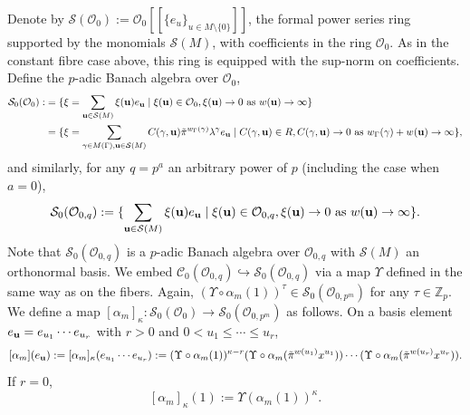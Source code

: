 \documentclass{article}
\theoremstyle{remark}
\def\bb #1{ {\mathbb #1} }
\def\c #1{ {\mathcal #1} }
\def\b #1{ {\bf #1} }
\begin{document}
\bigskip{}  Denote by $\c S(\c O_0) := \c O_0[[ \{ e_u \}_{u \in M \setminus \{0\}}]]$, the formal power series ring supported by the monomials $\c S(M)$, with coefficients in the ring $\c O_0$.  As in the constant fibre case above, this ring is equipped with the sup-norm on coefficients.  Define the $p$-adic Banach algebra over $\c O_0$,
\begin{align*}
\c S_0(\c O_0) :&= \{ \xi =  \sum_{\b u \in \c S(M)} \xi(\b u) e_{\b u} \mid \xi(\b u) \in \c O_0, \xi(\b u) \rightarrow 0 \text{ as } w(\b u) \rightarrow \infty \} \\
&= \{ \xi = \sum_{\gamma \in M(\Gamma), \b u \in \c S(M)} C(\gamma, \b u) \tilde \pi^{w_{\Gamma}(\gamma)} \lambda^\gamma e_{\b u} \mid C(\gamma, \b u) \in R, C(\gamma, \b u) \rightarrow 0 \text{ as } w_\Gamma(\gamma) + w(\b u) \rightarrow \infty \},
\end{align*}
and similarly, for any $q = p^a$ an arbitrary power of $p$ (including the case when $a = 0$),
\[
\c S_0(\c O_{0, q}) := \{ \sum_{\b u \in \c S(M)} \xi(\b u) e_{\b u} \mid \xi(\b u) \in \c O_{0, q}, \xi(\b u) \rightarrow 0 \text{ as } w(\b u) \rightarrow \infty \}.
\]
Note that $\c S_0(\c O_{0, q})$ is a $p$-adic Banach algebra over $\c O_{0, q}$ with  $\c S(M)$ an orthonormal basis. 
We embed $\c C_0(\c O_{0, q}) \hookrightarrow \c S_0(\c O_{0, q})$ via a map $\Upsilon$ defined in the same way as on the fibers.  Again,  $(\Upsilon \circ \alpha_m(1))^{\tau} \in \c S_0(\c O_{0, p^m})$ for any $\tau \in \bb Z_p$. We define a map $[\alpha_m]_\kappa : \c S_0(\c O_0) \rightarrow \c S_0(\c O_{0, p^m})$ as follows. On a basis element $e_{\b u} = e_{u_1} \cdots e_{u_r}$ with $r > 0$ and $0 < u_1 \leq \cdots \leq u_r$, 
\[
[\alpha_m](e_{\b u}) := [\alpha_m]_\kappa( e_{u_1} \cdots e_{u_r} ) := (\Upsilon \circ \alpha_m( 1 ))^{\kappa - r} (\Upsilon \circ \alpha_m (\tilde \pi^{w(u_1)} x^{u_1}) ) \cdots (\Upsilon \circ \alpha_m (\tilde \pi^{w(u_r)} x^{u_r})).
\]
If $r = 0$, 
\[
[\alpha_m]_\kappa(1) := \Upsilon( \alpha_m(1))^\kappa.
\]
\end{document}
